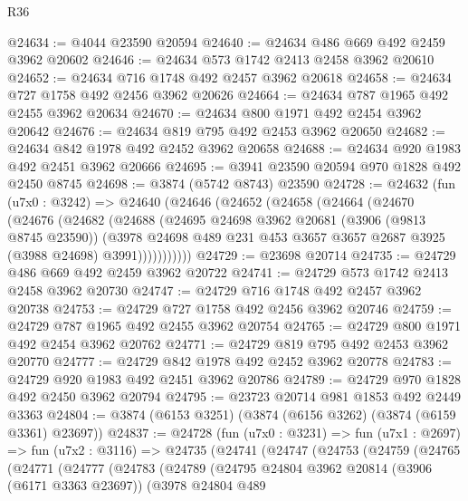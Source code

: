 \begin{lexlean}{R36}
\begin{coremodule}
@24634 := @4044 @23590 @20594
@24640 := @24634 @486 @669 @492 @2459 @3962 @20602
@24646 := @24634 @573 @1742 @2413 @2458 @3962 @20610
@24652 := @24634 @716 @1748 @492 @2457 @3962 @20618
@24658 := @24634 @727 @1758 @492 @2456 @3962 @20626
@24664 := @24634 @787 @1965 @492 @2455 @3962 @20634
@24670 := @24634 @800 @1971 @492 @2454 @3962 @20642
@24676 := @24634 @819 @795 @492 @2453 @3962 @20650
@24682 := @24634 @842 @1978 @492 @2452 @3962 @20658
@24688 := @24634 @920 @1983 @492 @2451 @3962 @20666
@24695 := @3941 @23590 @20594 @970 @1828 @492 @2450 @8745
@24698 := @3874 (@5742 @8743) @23590
@24728 := @24632
    (fun (u7x0 : @3242) =>
    @24640
      (@24646
        (@24652
          (@24658
            (@24664
              (@24670
                (@24676
                  (@24682
                    (@24688
                      (@24695
                        @24698
                        @3962
                        @20681
                        (@3906 (@9813 @8745 @23590))
                        (@3978
                          @24698
                          @489
                          @231
                          @453
                          @3657
                          @3657
                          @2687
                          @3925
                          (@3988 @24698)
                          @3991)))))))))))
@24729 := @23698 @20714
@24735 := @24729 @486 @669 @492 @2459 @3962 @20722
@24741 := @24729 @573 @1742 @2413 @2458 @3962 @20730
@24747 := @24729 @716 @1748 @492 @2457 @3962 @20738
@24753 := @24729 @727 @1758 @492 @2456 @3962 @20746
@24759 := @24729 @787 @1965 @492 @2455 @3962 @20754
@24765 := @24729 @800 @1971 @492 @2454 @3962 @20762
@24771 := @24729 @819 @795 @492 @2453 @3962 @20770
@24777 := @24729 @842 @1978 @492 @2452 @3962 @20778
@24783 := @24729 @920 @1983 @492 @2451 @3962 @20786
@24789 := @24729 @970 @1828 @492 @2450 @3962 @20794
@24795 := @23723 @20714 @981 @1853 @492 @2449 @3363
@24804 := @3874 (@6153 @3251) (@3874 (@6156 @3262) (@3874 (@6159 @3361) @23697))
@24837 := @24728
    (fun (u7x0 : @3231) =>
    fun (u7x1 : @2697) =>
    fun (u7x2 : @3116) =>
    @24735
      (@24741
        (@24747
          (@24753
            (@24759
              (@24765
                (@24771
                  (@24777
                    (@24783
                      (@24789
                        (@24795
                          @24804
                          @3962
                          @20814
                          (@3906 (@6171 @3363 @23697))
                          (@3978
                            @24804
                            @489

\end{coremodule}
\end{lexlean}
